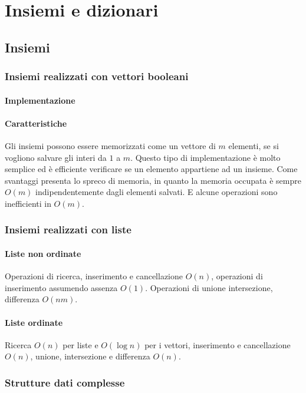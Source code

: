 \chapter{Insiemi e dizionari}
\section{Insiemi}
\subsection{Insiemi realizzati con vettori booleani}
\subsubsection{Implementazione}

\subsubsection{Caratteristiche}
Gli insiemi possono essere memorizzati come un vettore di $m$ elementi, se si vogliono salvare gli interi da $1$ a $m$. Questo tipo di implementazione \`e
molto semplice ed \`e efficiente verificare se un elemento appartiene ad un insieme. Come svantaggi presenta lo spreco di memoria, in quanto la memoria
occupata \`e sempre $O(m)$ indipendentemente dagli elementi salvati. E alcune operazioni sono inefficienti in $O(m)$.
\subsection{Insiemi realizzati con liste}
\subsubsection{Liste non ordinate}
Operazioni di ricerca, inserimento e cancellazione $O(n)$, operazioni di inserimento assumendo assenza $O(1)$. Operazioni di unione intersezione, differenza
$O(nm)$.

\subsubsection{Liste ordinate}
Ricerca $O(n)$ per liste e $O(\log n)$ per i vettori, inserimento e cancellazione $O(n)$, unione, intersezione e differenza $O(n)$.\\

\subsection{Strutture dati complesse}
